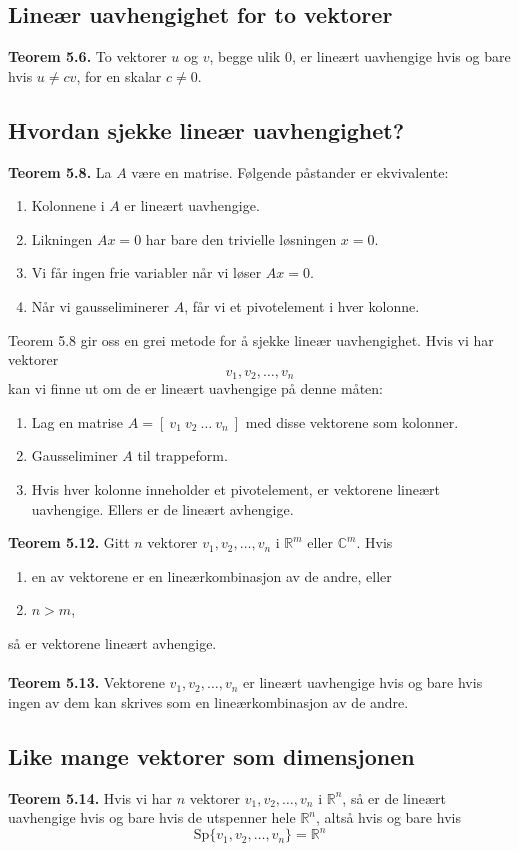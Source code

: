 \documentclass{article}
\begin{document}
\subsection{Lineær uavhengighet for to vektorer}
\textbf{Teorem 5.6.} To vektorer $u$ og $v$, begge ulik $0$, er lineært uavhengige hvis og bare hvis $u \neq cv$, for en skalar $c \neq 0$.


\subsection{Hvordan sjekke lineær uavhengighet?}
\textbf{Teorem 5.8.} La $A$ være en matrise. Følgende påstander er ekvivalente:
\begin{enumerate}
    \item Kolonnene i $A$ er lineært uavhengige.
    \item Likningen $Ax = 0$ har bare den trivielle løsningen $x = 0$.
    \item Vi får ingen frie variabler når vi løser $Ax = 0$.
    \item Når vi gausseliminerer $A$, får vi et pivotelement i hver kolonne.
\end{enumerate}
Teorem 5.8 gir oss en grei metode for å sjekke lineær uavhengighet. Hvis vi har vektorer
\[ v_1, v_2, \dots, v_n \]
kan vi finne ut om de er lineært uavhengige på denne måten:
\begin{enumerate}
    \item Lag en matrise $A = [ \ v_1 \ v_2 \ \dots \ v_n \ ]$ med disse vektorene som kolonner.
    \item Gausseliminer $A$ til trappeform.
    \item Hvis hver kolonne inneholder et pivotelement, er vektorene lineært uavhengige. Ellers er de lineært avhengige.
\end{enumerate}
\textbf{Teorem 5.12.} Gitt $n$ vektorer $v_1, v_2, \dots, v_n$ i $\mathbb{R}^m$ eller $\mathbb{C}^m$. Hvis \begin{enumerate}
    \item en av vektorene er en lineærkombinasjon av de andre, eller
    \item $n > m$,
\end{enumerate}
så er vektorene lineært avhengige.
\\\\
\textbf{Teorem 5.13.} Vektorene $v_1, v_2, \dots, v_n$ er lineært uavhengige hvis og bare hvis ingen av dem kan skrives som en lineærkombinasjon av de andre.


\subsection{Like mange vektorer som dimensjonen}
\textbf{Teorem 5.14.} Hvis vi har $n$ vektorer $v_1, v_2, \dots, v_n$ i $\mathbb{R}^n$, så er de lineært uavhengige hvis og bare hvis de utspenner hele $\mathbb{R}^n$, altså hvis og bare hvis
\[\text{Sp}\{v_1, v_2, \dots, v_n \} = \mathbb{R}^n \]
\end{document}
